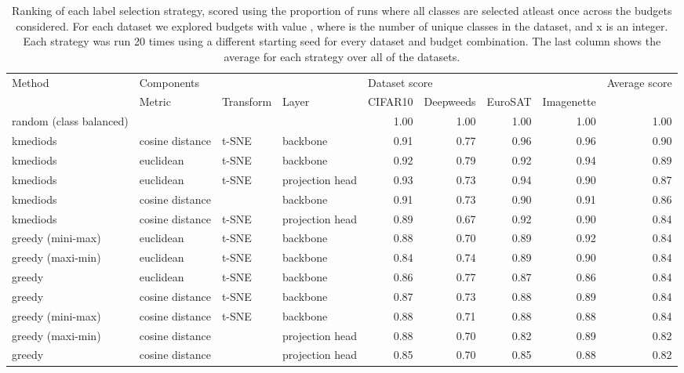 \documentclass{article}
\begin{document}
\begin{table*}[tp]
\centering
\caption{Ranking of each label selection strategy, scored using the proportion of runs where all classes are selected atleast once across the budgets considered. For each dataset we explored budgets with value , where  is the number of unique classes in the dataset, and x is an integer. Each strategy was run 20 times using a different starting seed for every dataset and budget combination. The last column shows the average for each strategy over all of the datasets.}
\label{tbl:unsupervised_class_detection_strategies_all}
\tiny
\begin{tabular}{llll|rrrr|r}
  \hline
Method & \multicolumn{3}{l}{Components} & \multicolumn{4}{l}{Dataset score} & Average score \\ 
\cmidrule{2-4} \cmidrule(lr){5-8}
 & Metric & Transform & Layer & CIFAR10 & Deepweeds & EuroSAT & Imagenette &  \\ 
  \hline
random (class balanced) &  &  &  & 1.00 & 1.00 & 1.00 & 1.00 & 1.00 \\ 
  kmediods & cosine distance & t-SNE & backbone & 0.91 & 0.77 & 0.96 & 0.96 & 0.90 \\ 
  kmediods & euclidean & t-SNE & backbone & 0.92 & 0.79 & 0.92 & 0.94 & 0.89 \\ 
  kmediods & euclidean & t-SNE & projection head & 0.93 & 0.73 & 0.94 & 0.90 & 0.87 \\ 
  kmediods & cosine distance &  & backbone & 0.91 & 0.73 & 0.90 & 0.91 & 0.86 \\ 
  kmediods & cosine distance & t-SNE & projection head & 0.89 & 0.67 & 0.92 & 0.90 & 0.84 \\ 
  greedy (mini-max) & euclidean & t-SNE & backbone & 0.88 & 0.70 & 0.89 & 0.92 & 0.84 \\ 
  greedy (maxi-min) & euclidean & t-SNE & backbone & 0.84 & 0.74 & 0.89 & 0.90 & 0.84 \\ 
  greedy & euclidean & t-SNE & backbone & 0.86 & 0.77 & 0.87 & 0.86 & 0.84 \\ 
  greedy & cosine distance & t-SNE & backbone & 0.87 & 0.73 & 0.88 & 0.89 & 0.84 \\ 
  greedy (mini-max) & cosine distance & t-SNE & backbone & 0.88 & 0.71 & 0.88 & 0.88 & 0.84 \\ 
  greedy (maxi-min) & cosine distance &  & projection head & 0.88 & 0.70 & 0.82 & 0.89 & 0.82 \\ 
  greedy & cosine distance &  & projection head & 0.85 & 0.70 & 0.85 & 0.88 & 0.82 \\ 

\end{tabular}
\end{table*}
\end{document}

